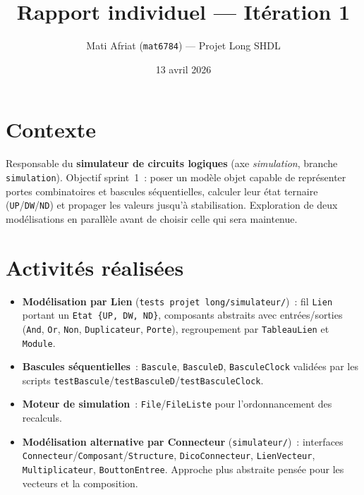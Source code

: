 \documentclass[11pt,a4paper]{article}
\title{\vspace{-1.5cm}Rapport individuel --- It\'eration 1}
\author{Mati Afriat (\texttt{mat6784}) --- Projet Long SHDL}
\date{13 avril 2026}
\begin{document}
\maketitle
\vspace{-2em}

\section*{Contexte}
Responsable du \textbf{simulateur de circuits logiques} (axe \emph{simulation}, branche \texttt{simulation}). Objectif sprint~1~: poser un mod\`ele objet capable de repr\'esenter portes combinatoires et bascules s\'equentielles, calculer leur \'etat ternaire (\texttt{UP}/\texttt{DW}/\texttt{ND}) et propager les valeurs jusqu'\`a stabilisation. Exploration de deux mod\'elisations en parall\`ele avant de choisir celle qui sera maintenue.

\section*{Activit\'es r\'ealis\'ees}
\begin{itemize}
  \item \textbf{Mod\'elisation par Lien} (\texttt{tests projet long/simulateur/})~: fil \texttt{Lien} portant un \texttt{Etat \{UP, DW, ND\}}, composants abstraits avec entr\'ees/sorties (\texttt{And}, \texttt{Or}, \texttt{Non}, \texttt{Duplicateur}, \texttt{Porte}), regroupement par \texttt{TableauLien} et \texttt{Module}.
  \item \textbf{Bascules s\'equentielles}~: \texttt{Bascule}, \texttt{BasculeD}, \texttt{BasculeClock} valid\'ees par les scripts \texttt{testBascule}/\texttt{testBasculeD}/\texttt{testBasculeClock}.
  \item \textbf{Moteur de simulation}~: \texttt{File}/\texttt{FileListe} pour l'ordonnancement des recalculs.
  \item \textbf{Mod\'elisation alternative par Connecteur} (\texttt{simulateur/})~: interfaces \texttt{Connecteur}/\texttt{Composant}/\texttt{Structure}, \texttt{DicoConnecteur}, \texttt{LienVecteur}, \texttt{Multiplicateur}, \texttt{BouttonEntree}. Approche plus abstraite pens\'ee pour les vecteurs et la composition.
\end{itemize}
\end{document}
